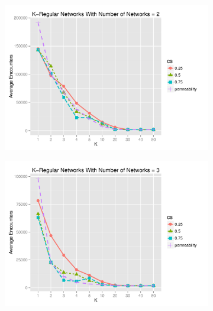 \documentclass[preprint,number]{elsarticle}
\begin{document}
      \begin{figure}[H]
        \centering
	\begin{subfigure}{.49\linewidth}
          \centering
          \includegraphics[width=1\linewidth]{"../analysis/pdf/context_switching_encounters_comp_kregular_groupedbynets_2"}
          \caption{}
          \label{fig:ctx_switching_comp_kreg_2}
	\end{subfigure}%
	\begin{subfigure}{.5\linewidth}
          \centering
          \includegraphics[width=1\linewidth]{"../analysis/pdf/context_switching_encounters_comp_kregular_groupedbynets_3"}
          \caption{}
          \label{fig:ctx_switching_comp_kreg_3}
	\end{subfigure}\\
	\begin{subfigure}{.49\linewidth}

\end{subfigure}
\end{figure}
\end{document}
